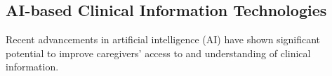 





\subsection{AI-based Clinical Information Technologies}
 
Recent advancements in artificial intelligence (AI) have shown significant potential to improve caregivers' access to and understanding of clinical information. 

